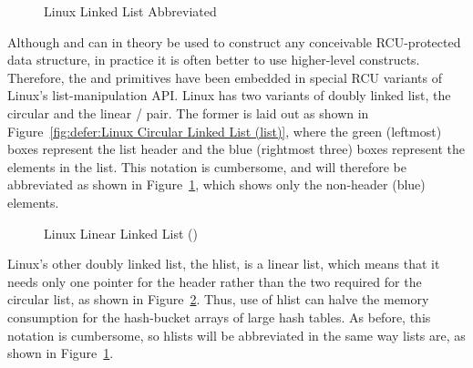 \begin{figure}[tb]
\centering
{}
\caption{Linux Linked List Abbreviated}
\label{fig:defer:Linux Linked List Abbreviated}
\end{figure}

Although  and
 can in theory be used to construct any
conceivable RCU-protected data structure, in practice it is often better
to use higher-level constructs.
Therefore, the  and
primitives have been embedded in special RCU variants of Linux's
list-manipulation API.
Linux has two variants of doubly linked list, the circular
 and the linear
/ pair.
The former is laid out as shown in
Figure~\ref{fig:defer:Linux Circular Linked List (list)},
where the green (leftmost) boxes represent the list header and the blue
(rightmost three) boxes represent the elements in the list.
This notation is cumbersome, and will therefore be abbreviated as shown in
Figure~\ref{fig:defer:Linux Linked List Abbreviated},
which shows only the non-header (blue) elements.

\begin{figure}[tb]
\centering
{}
\caption{Linux Linear Linked List ()}
\label{fig:defer:Linux Linear Linked List (hlist)}
\end{figure}

Linux's other doubly linked list, the hlist,
is a linear list, which means that
it needs only one pointer for the header rather than the two
required for the circular list, as shown in
Figure~\ref{fig:defer:Linux Linear Linked List (hlist)}.
Thus, use of hlist can halve the memory consumption for the hash-bucket
arrays of large hash tables.
As before, this notation is cumbersome, so hlists will be abbreviated
in the same way lists are, as shown in
Figure~\ref{fig:defer:Linux Linked List Abbreviated}.

